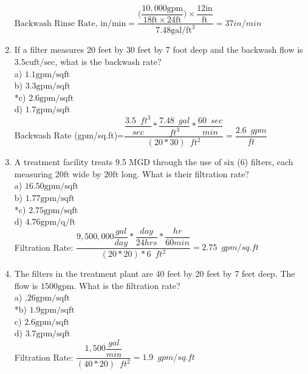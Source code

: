 \documentclass{article}
\begin{document}
\begin{enumerate}
$\text{Backwash Rinse Rate, in/} \mathrm{min}=
\dfrac{\Biggl(\dfrac{10,000 \mathrm{gpm}}{18 \mathrm{ft} \times 24 \mathrm{ft}}\Biggr) \times \dfrac{12 \mathrm{in}}{\mathrm{ft}}
}
{
7.48 \mathrm{gal} / \mathrm{ft}^{3}
}=\boxed{37in/min}$
\item If a filter measures 20 feet by 30 feet by 7 foot deep and the backwash flow is $3.5 \mathrm{cuft} / \mathrm{sec}$, what is the backwash rate?\\
a) $1.1 \mathrm{gpm} / \mathrm{sqft}$\\
b) $3.3 \mathrm{gpm} / \mathrm{sqft}$\\
*c) $2.6 \mathrm{gpm} / \mathrm{sqft}$\\
d) $1.7 \mathrm{gpm} / \mathrm{sqft}$\\
\vspace{0.2cm}
Backwash Rate (gpm/sq.ft)=$\dfrac{\dfrac{3.5 \enspace ft^3}{sec}*\dfrac{7.48 \enspace gal}{ft^3}*\dfrac{60 \enspace sec}{min}}{(20*30) \enspace ft^2}=\boxed{\dfrac{2.6 \enspace gpm}{ft}}$
 \item A treatment facility treats 9.5 MGD through the use of six (6) filters, each measuring $20 \mathrm{ft}$ wide by $20 \mathrm{ft}$ long. What is their filtration rate?\\
a) $16.50 \mathrm{gpm} / \mathrm{sqft}$\\
b) $1.77 \mathrm{gpm} / \mathrm{sqft}$\\
*c) $2.75 \mathrm{gpm} / \mathrm{sqft}$\\
d) $4.76 \mathrm{gpm} / \mathrm{q} / \mathrm{ft}$\\
\vspace{0.2cm}
Filtration Rate:  $ \dfrac{9,500,000\dfrac{gal}{day}*\dfrac{day}{24hrs}*\dfrac{hr}{60min}}{(20*20)*6 \enspace ft^2} = \boxed{2.75 \enspace gpm/sq.ft}$
      \item The filters in the treatment plant are 40 feet by 20 feet by 7 feet deep. The flow is $1500 \mathrm{gpm}$. What is the filtration rate?\\
a) $.26 \mathrm{gpm} / \mathrm{sq} \mathrm{ft}$\\
*b) $1.9 \mathrm{gpm} / \mathrm{sq} \mathrm{ft}$\\
c) $2.6 \mathrm{gpm} / \mathrm{sq} \mathrm{ft}$\\
d) $3.7 \mathrm{gpm} / \mathrm{sq} \mathrm{ft}$\\
\vspace{0.2cm}
Filtration Rate:  $\dfrac{1,500\dfrac{gal}{min}}{(40*20) \enspace ft^2} = \boxed{1.9 \enspace gpm/sq.ft}$


\end{enumerate}
\end{document}
